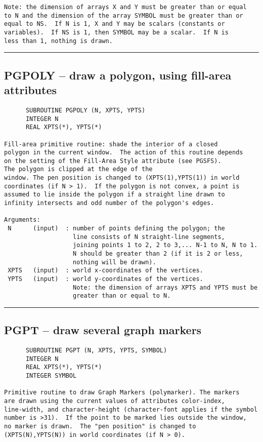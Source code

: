 {\begin{verbatim}
Note: the dimension of arrays X and Y must be greater than or equal
to N and the dimension of the array SYMBOL must be greater than or
equal to NS.  If N is 1, X and Y may be scalars (constants or
variables).  If NS is 1, then SYMBOL may be a scalar.  If N is
less than 1, nothing is drawn.
\end{verbatim}
\hrule


\subsection*{PGPOLY -- draw a polygon, using fill-area attributes }
\begin{verbatim}
      SUBROUTINE PGPOLY (N, XPTS, YPTS)
      INTEGER N
      REAL XPTS(*), YPTS(*)

Fill-area primitive routine: shade the interior of a closed
polygon in the current window.  The action of this routine depends
on the setting of the Fill-Area Style attribute (see PGSFS).
The polygon is clipped at the edge of the
window. The pen position is changed to (XPTS(1),YPTS(1)) in world
coordinates (if N > 1).  If the polygon is not convex, a point is
assumed to lie inside the polygon if a straight line drawn to
infinity intersects and odd number of the polygon's edges.

Arguments:
 N      (input)  : number of points defining the polygon; the
                   line consists of N straight-line segments,
                   joining points 1 to 2, 2 to 3,... N-1 to N, N to 1.
                   N should be greater than 2 (if it is 2 or less,
                   nothing will be drawn).
 XPTS   (input)  : world x-coordinates of the vertices.
 YPTS   (input)  : world y-coordinates of the vertices.
                   Note: the dimension of arrays XPTS and YPTS must be
                   greater than or equal to N.
\end{verbatim}
\hrule


\subsection*{PGPT -- draw several graph markers }
\begin{verbatim}
      SUBROUTINE PGPT (N, XPTS, YPTS, SYMBOL)
      INTEGER N
      REAL XPTS(*), YPTS(*)
      INTEGER SYMBOL

Primitive routine to draw Graph Markers (polymarker). The markers
are drawn using the current values of attributes color-index,
line-width, and character-height (character-font applies if the symbol
number is >31).  If the point to be marked lies outside the window,
no marker is drawn.  The "pen position" is changed to
(XPTS(N),YPTS(N)) in world coordinates (if N > 0).


\end{verbatim}}
